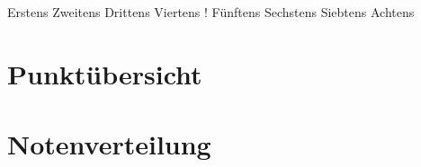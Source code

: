 \documentclass[a4paper]{scrartcl}
\begin{document}
\begin{aufgabe}
    \begin{mcumgebung}
        \choice Erstens
        \choice Zweitens
        \choice Drittens
        \choice[\mcrichtig] Viertens
        \choice! Fünftens
        \choice[\mcrichtig] Sechstens
        \choice Siebtens
        \choice[\mcrichtig] Achtens
    \end{mcumgebung}

    \begin{loesung}
        \mcloesung
    \end{loesung}
\end{aufgabe}

\section*{Punktübersicht}
    \punktuebersicht

\section*{Notenverteilung}
    \notenverteilung
\end{document}
